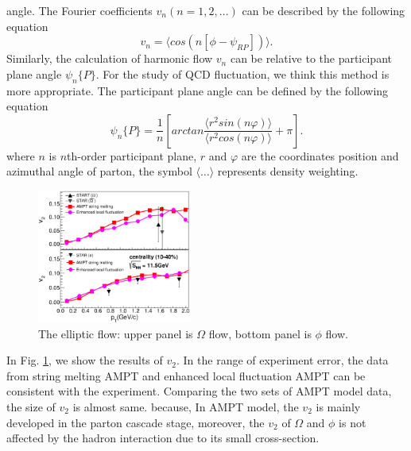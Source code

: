 \documentclass[twocolumn,aps,prc,showpacs,superscriptaddress,preprintnumbers,floatfix,nofootinbib]{revtex4}
\begin{document}
\begin{CJK*}{GBK}{song}
angle. The Fourier coefficients $v_{n}(n=1,2,\dots)$ can be described by the following equation
\begin{equation}
  \label{eq:equationflow}
  v_{n} = \langle{cos(n[\phi-\psi_{RP}])}\rangle.
\end{equation}
Similarly, the calculation of harmonic flow $v_{n}$ can be relative to the participant
plane angle $\psi_{n}\{P\}$. For the study of QCD fluctuation, we think this method is
more appropriate. The participant plane angle can be defined by the following equation
\begin{equation}
  \label{eq:equationparticipant}
  \psi_{n}\{P\} = \frac{1}{n}\left[arctan\frac{\langle{r^{2}sin(n\varphi)}\rangle}{\langle{r^{2}cos(n\varphi)}\rangle}+\pi\right].
\end{equation}
where $n$ is $n$th-order participant plane, $r$ and $\varphi$ are the coordinates position and
azimuthal angle of parton, the symbol $\langle{\dots}\rangle$ represents density weighting.
\begin{figure}[htbp]
  \centering
  \includegraphics[width=0.45\textwidth]{./figure/flow.eps}
  \caption{The elliptic flow: upper panel is $\Omega$ flow, bottom panel is $\phi$ flow.}
  \label{fig:figureflow}
\end{figure}
In Fig. \ref{fig:figureflow}, we show the results of $v_{2}$. In  the range of experiment error, the data from string melting AMPT and
enhanced local fluctuation AMPT can be consistent with the experiment. Comparing the
two sets of AMPT model data, the size of  $v_{2}$ is almost same. because, In AMPT
model, the $v_{2}$ is mainly developed in the parton cascade stage, moreover,
the $v_{2}$ of $\Omega$ and $\phi$ is not affected by the hadron interaction due to its
small cross-section.


\end{CJK*}
\end{document}
